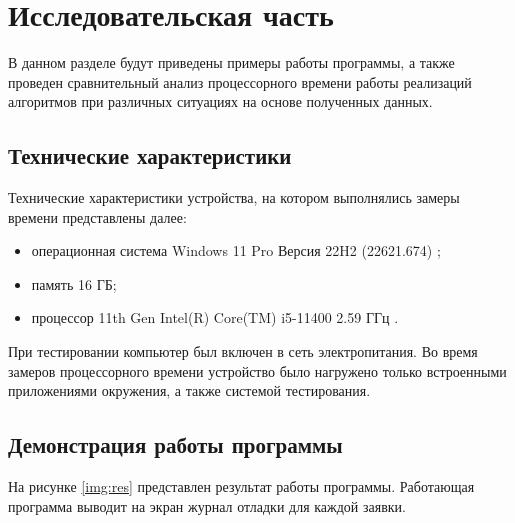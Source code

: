 \chapter{Исследовательская часть}

В данном разделе будут приведены примеры работы программы, а также проведен сравнительный анализ процессорного времени работы реализаций алгоритмов при различных ситуациях на основе полученных данных.

\section{Технические характеристики}

Технические характеристики устройства, на котором выполнялись замеры времени представлены далее:

\begin{itemize}
	\item операционная система Windows 11 Pro Версия 22H2 (22621.674) \cite{wind};
	\item память 16 ГБ;
	\item процессор 11th Gen Intel(R) Core(TM) i5-11400 2.59 ГГц \cite{proc}.
\end{itemize}

При тестировании компьютер был включен в сеть электропитания. Во время замеров процессорного времени устройство было нагружено только встроенными приложениями окружения, а также системой тестирования.

\section{Демонстрация работы программы}

На рисунке \ref{img:res} представлен результат работы программы. Работающая программа выводит на экран журнал отладки для каждой заявки.
\begin{center}
	\label{img:res}
\end{center}

